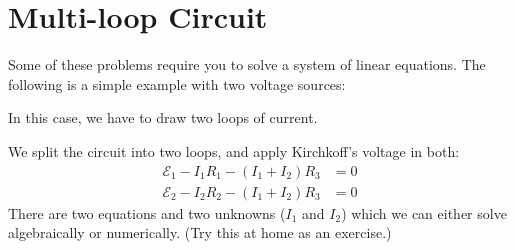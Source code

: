 \section{Multi-loop Circuit}
Some of these problems require you to solve a system of linear equations.
The following is a simple example with two voltage sources:
\begin{center}
\end{center}
In this case, we have to draw two loops of current.




  
We split the circuit into two loops, and apply Kirchkoff's voltage in both:
\begin{align*}
  \mathcal E_1-I_1R_1-(I_1+I_2)R_3&=0\\
  \mathcal E_2-I_2R_2-(I_1+I_2)R_3&=0
\end{align*}
There are two equations and two unknowns ($I_1$ and $I_2$) which we can either
solve algebraically or numerically. %
%
(Try this at home as an exercise.)



